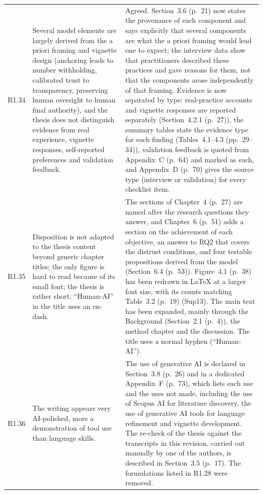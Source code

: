 \documentclass[12pt,a4paper,twoside]{article}
\begin{document}
{\begin{longtable}{p{1cm}p{6.7cm}p{7cm}}
R1.34 &
Several model elements are largely derived from the a priori framing and vignette design (anchoring leads to number withholding, calibrated trust to transparency, preserving human oversight to human final authority), and the thesis does not distinguish evidence from real experience, vignette responses, self-reported preferences and validation feedback. &
Agreed. Section~3.6 (p.~21) now states the provenance of each component and says explicitly that several components are what the a priori framing would lead one to expect; the interview data show that practitioners described these practices and gave reasons for them, not that the components arose independently of that framing. Evidence is now separated by type: real-practice accounts and vignette responses are reported separately (Section~4.2.1 (p.~27)), the summary tables state the evidence type for each finding (Tables~4.1--4.3 (pp.~29--34)), validation feedback is quoted from Appendix~C (p.~64) and marked as such, and Appendix~D (p.~70) gives the source type (interview or validation) for every checklist item. \\

R1.35 &
Disposition is not adapted to the thesis content beyond generic chapter titles; the only figure is hard to read because of its small font; the thesis is rather short; ``Human-AI'' in the title uses an en-dash. &
The sections of Chapter~4 (p.~27) are named after the research questions they answer, and Chapter~6 (p.~51) adds a section on the achievement of each objective, an answer to RQ2 that covers the distrust conditions, and four testable propositions derived from the model (Section~6.4 (p.~53)). Figure~4.1 (p.~38) has been redrawn in LaTeX at a larger font size, with its counts matching Table~3.2 (p.~19) (Sup13). The main text has been expanded, mainly through the Background (Section~2.1 (p.~4)), the method chapter and the discussion. The title uses a normal hyphen (``Human-AI''). \\

R1.36 &
The writing appears very AI-polished, more a demonstration of tool use than language skills. &
The use of generative AI is declared in Section~3.8 (p.~26) and in a dedicated Appendix~F (p.~73), which lists each use and the uses not made, including the use of Scopus AI for literature discovery, the use of generative AI tools for language refinement and vignette development. The re-check of the thesis against the transcripts in this revision, carried out manually by one of the authors, is described in Section~3.5 (p.~17). The formulations listed in R1.28 were removed. \\


\end{longtable}}
\end{document}
